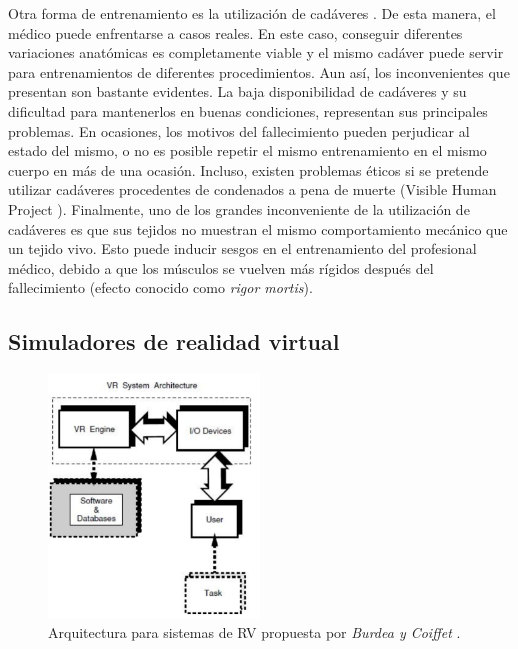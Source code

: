 Otra forma de entrenamiento es la utilización de cadáveres \cite{Tsui2007}. De esta manera, el médico puede enfrentarse a casos reales. En este caso, conseguir diferentes variaciones anatómicas es completamente viable y el mismo cadáver puede servir para entrenamientos de diferentes procedimientos. Aun así, los inconvenientes que presentan son bastante evidentes. 
La baja disponibilidad de cadáveres y su dificultad para mantenerlos en buenas condiciones, representan sus principales problemas. En ocasiones, los motivos del fallecimiento pueden perjudicar al estado del mismo, o no es posible repetir el mismo entrenamiento en el mismo cuerpo en más de una ocasión. Incluso, existen problemas éticos si se pretende utilizar cadáveres procedentes de condenados a pena de muerte (Visible Human Project \cite{ackerman1998visible}).
Finalmente, uno de los grandes inconveniente de la utilización de cadáveres es que sus tejidos no muestran el mismo comportamiento mecánico que un tejido vivo. Esto puede inducir sesgos en el entrenamiento del profesional médico, debido a que los músculos se vuelven más rígidos después del fallecimiento (efecto conocido como \emph{rigor mortis}).

\subsection{Simuladores de realidad virtual}
\label{art:simulador}

\begin{figure}[ht]
   \centering
    \includegraphics[width=0.5\textwidth]{IMG/VRarq.PNG}
    \caption{Arquitectura para sistemas de \acs{RV} propuesta por \emph{Burdea y Coiffet} \cite{burdea2003virtual}. }
   \label{fig:RVarq}
\end{figure}

